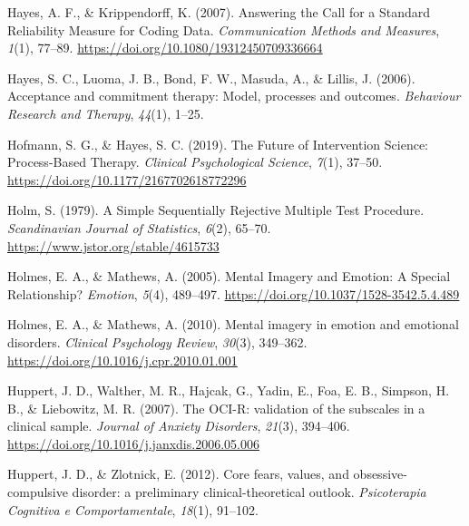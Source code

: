 \documentclass[
  man,floatsintext]{apa7}
\newlength{\cslhangindent}
\newlength{\cslentryspacingunit} %
\newenvironment{CSLReferences}[2] %
 {%
  \setlength{\parindent}{0pt}
  \ifodd #1
  \let\oldpar\par
  \def\par{\hangindent=\cslhangindent\oldpar}
  \fi
  \setlength{\parskip}{#2\cslentryspacingunit}
 }%
 {}
\begin{document}
\begin{CSLReferences}{1}{0}
\leavevmode{}%
Hayes, A. F., \& Krippendorff, K. (2007). Answering the Call for a Standard Reliability Measure for Coding Data. \emph{Communication Methods and Measures}, \emph{1}(1), 77--89. \url{https://doi.org/10.1080/19312450709336664}

\leavevmode{}%
Hayes, S. C., Luoma, J. B., Bond, F. W., Masuda, A., \& Lillis, J. (2006). Acceptance and commitment therapy: Model, processes and outcomes. \emph{Behaviour Research and Therapy}, \emph{44}(1), 1--25.

\leavevmode{}%
Hofmann, S. G., \& Hayes, S. C. (2019). The Future of Intervention Science: Process-Based Therapy. \emph{Clinical Psychological Science}, \emph{7}(1), 37--50. \url{https://doi.org/10.1177/2167702618772296}

\leavevmode{}%
Holm, S. (1979). A Simple Sequentially Rejective Multiple Test Procedure. \emph{Scandinavian Journal of Statistics}, \emph{6}(2), 65--70. \url{https://www.jstor.org/stable/4615733}

\leavevmode{}%
Holmes, E. A., \& Mathews, A. (2005). Mental Imagery and Emotion: A Special Relationship? \emph{Emotion}, \emph{5}(4), 489--497. \url{https://doi.org/10.1037/1528-3542.5.4.489}

\leavevmode{}%
Holmes, E. A., \& Mathews, A. (2010). Mental imagery in emotion and emotional disorders. \emph{Clinical Psychology Review}, \emph{30}(3), 349--362. \url{https://doi.org/10.1016/j.cpr.2010.01.001}

\leavevmode{}%
Huppert, J. D., Walther, M. R., Hajcak, G., Yadin, E., Foa, E. B., Simpson, H. B., \& Liebowitz, M. R. (2007). The OCI-R: validation of the subscales in a clinical sample. \emph{Journal of Anxiety Disorders}, \emph{21}(3), 394--406. \url{https://doi.org/10.1016/j.janxdis.2006.05.006}

\leavevmode{}%
Huppert, J. D., \& Zlotnick, E. (2012). Core fears, values, and obsessive-compulsive disorder: a preliminary clinical-theoretical outlook. \emph{Psicoterapia Cognitiva e Comportamentale}, \emph{18}(1), 91--102.


\end{CSLReferences}
\end{document}
